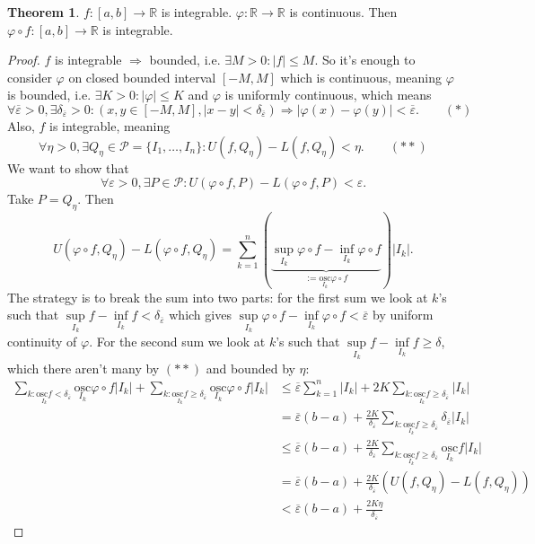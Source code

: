 \documentclass[a4paper]{article}
\newcommand{\osc}{\text{osc}}
\theoremstyle{definition}
\newtheorem{thm}[defn]{Theorem}
\begin{document}
\begin{thm}
\label{compofcontandintisint}
	$f:[a,b]\rightarrow \mathbb R$ is integrable. $\varphi: \mathbb R \rightarrow \mathbb R$ is continuous. Then $\varphi \circ f:[a,b]\rightarrow \mathbb R$ is integrable.
\end{thm}
\begin{proof}
	$f$ is integrable $\Rightarrow$ bounded, i.e. $\exists M>0:|f| \leq M$. So it's enough to consider $\varphi$ on closed bounded interval $[-M,M]$ which is continuous, meaning $\varphi$ is bounded, i.e. $\exists K>0:|\varphi|\leq K$ and $\varphi$ is uniformly continuous, which means
\[
\forall \overline\varepsilon >0, \exists \delta_{\overline\varepsilon} >0 : (x,y\in[-M,M],|x-y|<\delta_{\overline\varepsilon}) \Rightarrow |\varphi(x)-\varphi(y)|<\overline\varepsilon . \qquad (\ast)
\]
Also, $f$ is integrable, meaning
\[
\forall \eta >0, \exists Q_\eta \in \mathcal P=\{I_1,\ldots,I_n\} : U(f,Q_\eta)-L(f,Q_\eta) < \eta . \qquad (\ast\ast)
\]
We want to show that
\[
\forall \varepsilon >0, \exists P \in \mathcal P : U(\varphi \circ f, P)-L(\varphi \circ f,P) < \varepsilon .
\]
Take $P=Q_\eta$. Then
\[
U(\varphi \circ f, Q_\eta)-L(\varphi \circ f,Q_\eta) = \sum_{k=1}^{n} \left(\underbrace{ \underset{I_k}{\sup} \varphi \circ f - \underset{I_k}{\inf} \varphi \circ f}_{:=\underset{I_k}{\osc} \varphi \circ f} \right) \left|I_k\right| .
\]
The strategy is to break the sum into two parts: for the first sum we look at $k$'s such that $\underset{I_k}{\sup} f - \underset{I_k}{\inf} f < \delta_{\overline{\varepsilon}}$ which gives $\underset{I_k}{\sup} \varphi \circ f - \underset{I_k}{\inf} \varphi \circ f < \overline{\varepsilon}$ by uniform continuity of $\varphi$. For the second sum we look at $k$'s such that $\underset{I_k}{\sup} f - \underset{I_k}{\inf} f \geq \delta$, which there aren't many by $(\ast\ast)$ and bounded by $\eta$:
\[
\begin{aligned}\sum_{k:\underset{I_k}{\osc f}<\delta_{\overline{\varepsilon}}} \underset{I_k}{\osc} \varphi \circ f |I_k|+\sum_{k:\underset{I_k}{\osc f}\geq \delta_{\overline{\varepsilon}}} \underset{I_k}{\osc} \varphi \circ f |I_k| &\leq \overline{\varepsilon} \sum_{k=1}^n |I_k| +2K \sum_{k:\underset{I_k}{\osc f}\geq \delta_{\overline{\varepsilon}}} |I_k| \\ &=\overline{\varepsilon}(b-a) +\frac{2K}{\delta_{\overline{\varepsilon}}} \sum_{k:\underset{I_k}{\osc f}\geq \delta_{\overline{\varepsilon}}}\delta_{\overline{\varepsilon}} |I_k| \\ &\leq \overline{\varepsilon}(b-a) +\frac{2K}{\delta_{\overline{\varepsilon}}} \sum_{k:\underset{I_k}{\osc f}\geq \delta_{\overline{\varepsilon}}} \underset{I_k}{\osc} f |I_k| \\ &= \overline{\varepsilon}(b-a) +\frac{2K}{\delta_{\overline{\varepsilon}}}  \left(U(f,Q_\eta)-L(f,Q_\eta)\right) \\ &< \overline{\varepsilon}(b-a)+ \frac{2K \eta}{\delta_{\overline{\varepsilon}}} \end{aligned}
\]
\end{proof}
\end{document}
